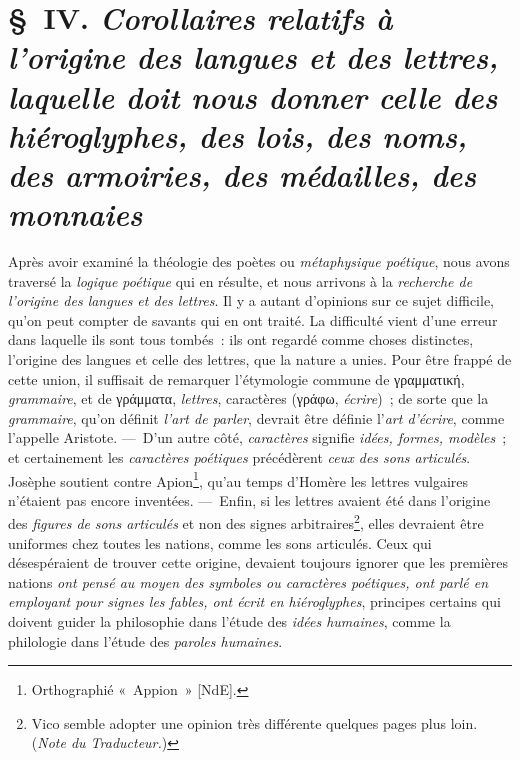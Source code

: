 \documentclass[french,twoside]{book} %
\begin{document}
\section[{§ IV. Corollaires relatifs à l’origine des langues et des lettres, laquelle doit nous donner celle des hiéroglyphes, des lois, des noms, des armoiries, des médailles, des monnaies}]{§ IV. {\itshape Corollaires relatifs à l’origine des langues et des lettres, laquelle doit nous donner celle des hiéroglyphes, des lois, des noms, des armoiries, des médailles, des monnaies}}
\noindent  Après avoir examiné la théologie des poètes ou {\itshape métaphysique poétique}, nous avons traversé la {\itshape logique poétique} qui en résulte, et nous arrivons à la {\itshape recherche de l’origine des langues et des lettres}. Il y a autant d’opinions sur ce sujet difficile, qu’on peut compter de savants qui en ont traité. La difficulté vient d’une erreur dans laquelle ils sont tous tombés : ils ont regardé comme choses distinctes, l’origine des langues et celle des lettres, que la nature a unies. Pour être frappé de cette union, il suffisait de remarquer l’étymologie commune de γραμματική, {\itshape grammaire}, et de γράμματα, {\itshape lettres}, caractères (γράφω, {\itshape écrire}) ; de sorte que la {\itshape grammaire}, qu’on définit {\itshape l’art de parler}, devrait être définie l’{\itshape art d’écrire}, comme l’appelle Aristote. — D’un autre côté, {\itshape caractères} signifie {\itshape idées, formes, modèles} ; et certainement les {\itshape caractères poétiques} précédèrent {\itshape ceux des sons articulés}. Josèphe soutient contre Apion\footnote{Orthographié « Appion » [NdE].}, qu’au temps d’Homère les lettres vulgaires n’étaient pas encore inventées. — Enfin, si les lettres avaient été dans l’origine des {\itshape figures de}  {\itshape sons articulés} et non des signes arbitraires\footnote{Vico semble adopter une opinion très différente quelques pages plus loin. ({\itshape Note du Traducteur.})}, elles devraient être uniformes chez toutes les nations, comme les sons articulés. Ceux qui désespéraient de trouver cette origine, devaient toujours ignorer que les premières nations {\itshape ont pensé au moyen des symboles ou caractères poétiques, ont parlé en employant pour signes les fables, ont écrit en hiéroglyphes}, principes certains qui doivent guider la philosophie dans l’étude des {\itshape idées humaines}, comme la philologie dans l’étude des {\itshape paroles humaines}.\par
\end{document}
